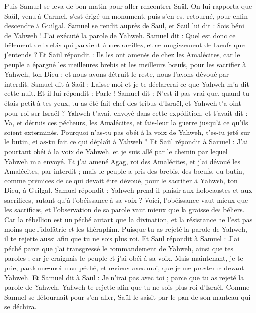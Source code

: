\begin{multicols}{2}
Puis Samuel se leva de bon matin pour aller rencontrer Saül. On lui rapporta que Saül, venu à Carmel, s'est érigé un monument, puis s'en est retourné, pour enfin descendre à Guilgal.
Samuel se rendit auprès de Saül, et Saül lui dit : Sois béni de Yahweh ! J'ai exécuté la parole de Yahweh.
Samuel dit : Quel est donc ce bêlement de brebis qui parvient à mes oreilles, et ce mugissement de bœufs que j'entends ?
Et Saül répondit : Ils les ont amenés de chez les Amalécites, car le peuple a épargné les meilleures brebis et les meilleurs bœufs, pour les sacrifier à Yahweh, ton Dieu ; et nous avons détruit le reste, nous l'avons dévoué par interdit.
Samuel dit à Saül : Laisse-moi et je te déclarerai ce que Yahweh m'a dit cette nuit. Et il lui répondit : Parle !
Samuel dit : N'est-il pas vrai que, quand tu étais petit à tes yeux, tu as été fait chef des tribus d'Israël, et Yahweh t'a oint pour roi sur Israël ?
Yahweh t'avait envoyé dans cette expédition, et t'avait dit : Va, et détruis ces pécheurs, les Amalécites, et fais-leur la guerre jusqu'à ce qu'ils soient exterminés.
Pourquoi n'as-tu pas obéi à la voix de Yahweh, t'es-tu jeté sur le butin, et as-tu fait ce qui déplaît à Yahweh ?
Et Saül répondit à Samuel : J'ai pourtant obéi à la voix de Yahweh, et je suis allé par le chemin par lequel Yahweh m'a envoyé. Et j'ai amené Agag, roi des Amalécites, et j'ai dévoué les Amalécites, par interdit ;
mais le peuple a pris des brebis, des bœufs, du butin, comme prémices de ce qui devait être dévoué, pour le sacrifier à Yahweh, ton Dieu, à Guilgal.
Samuel répondit : Yahweh prend-il plaisir aux holocaustes et aux sacrifices, autant qu'à l'obéissance à sa voix ? Voici, l'obéissance vaut mieux que les sacrifices, et l'observation de sa parole vaut mieux que la graisse des béliers.
Car la rébellion est un péché autant que la divination, et la résistance ne l'est pas moins que l'idolâtrie et les théraphim. Puisque tu as rejeté la parole de Yahweh, il te rejette aussi afin que tu ne sois plus roi.
Et Saül répondit à Samuel : J'ai péché parce que j'ai transgressé le commandement de Yahweh, ainsi que tes paroles ; car je craignais le peuple et j'ai obéi à sa voix.
Mais maintenant, je te prie, pardonne-moi mon péché, et reviens avec moi, que je me prosterne devant Yahweh.
Et Samuel dit à Saül : Je n'irai pas avec toi ; parce que tu as rejeté la parole de Yahweh, Yahweh te rejette afin que tu ne sois plus roi d'Israël.
Comme Samuel se détournait pour s'en aller, Saül le saisit par le pan de son manteau qui se déchira.

\end{multicols}
